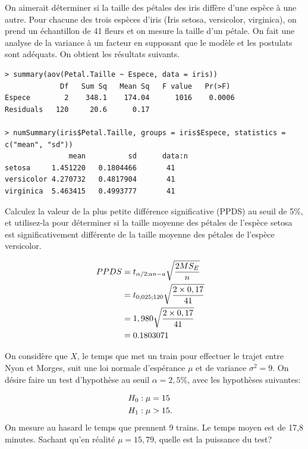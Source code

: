 \begin{questions}
\question[8]

On aimerait déterminer si la taille des pétales des iris diffère d'une espèce à une autre. Pour chacune des trois espèces d'iris (Iris setosa, versicolor, virginica), on prend un échantillon de 41 fleurs et on mesure la taille d'un pétale. On fait une analyse de la variance à un facteur en supposant que le modèle et les postulats sont adéquats. On obtient les résultats suivants. 

\begin{verbatim}
> summary(aov(Petal.Taille ~ Espece, data = iris))
             Df   Sum Sq   Mean Sq   F value   Pr(>F)    
Espece        2    348.1    174.04      1016    0.0006
Residuals   120     20.6      0.17  

> numSummary(iris$Petal.Taille, groups = iris$Espece, statistics = c("mean", "sd"))
               mean          sd      data:n
setosa     1.451220   0.1804466       41
versicolor 4.270732   0.4817904       41
virginica  5.463415   0.4993777       41
\end{verbatim}


Calculez la valeur de la plus petite différence significative (PPDS) au seuil de 5\%, et utilisez-la 
pour déterminer si la taille moyenne des pétales de l'espèce setosa est significativement différente de la taille
moyenne des pétales de l'espèce versicolor.


\begin{solution}
\begin{align*}
PPDS &= t_{\alpha/2; an-a}\sqrt{\frac{2MS_E}{n}} \cr 
&= t_{0,025; 120}\sqrt{\frac{2\times 0,17}{41}}\cr 
&= 1,980 \sqrt{\frac{2\times 0,17}{41}}\cr 
&= 0.1803071
\end{align*}
\end{solution}


\pageblanche
\question[12]\label{puissance}

On considère que $X$, le temps que met un train pour effectuer le trajet entre Nyon et Morges, suit une loi normale d'espérance $\mu$ et de variance $\sigma^2=9$. On désire faire un test d'hypothèse au seuil $\alpha = 2,5\%$, avec les hypothèses suivantes:

\begin{align*}
	H_0&: \mu=15\cr
	H_1&: \mu > 15.
\end{align*}
On mesure au hasard le temps que prennent 9 trains. Le temps moyen est de 17,8 minutes. Sachant qu'en réalité $\mu = 15,79$, quelle est la puissance du test?



\end{questions}
